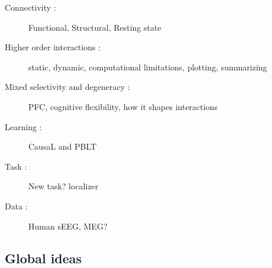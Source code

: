 \documentclass[a4paper,11pt]{article}
\begin{document}
\begin{description}
    \item[Connectivity :] Functional, Structural, Resting state
    \item[Higher order interactions :] static, dynamic, computational limitations, plotting, summarizing
    \item[Mixed selectivity and degeneracy :] PFC, cognitive flexibility, how it shapes interactions
    \item[Learning :] CausaL and PBLT
    \item[Task :] New task? localizer
    \item[Data :] Human sEEG, MEG?
\end{description}

\subsection{Global ideas}
\end{document}
